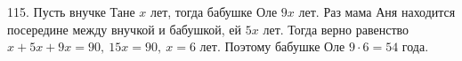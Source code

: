 115. Пусть внучке Тане $x$ лет, тогда бабушке Оле $9x$ лет. Раз мама Аня находится посередине между внучкой и бабушкой, ей $5x$ лет. Тогда верно равенство $x+5x+9x=90,\ 15x=90,\ x=6$ лет. Поэтому бабушке Оле $9\cdot6=54$ года.\\
